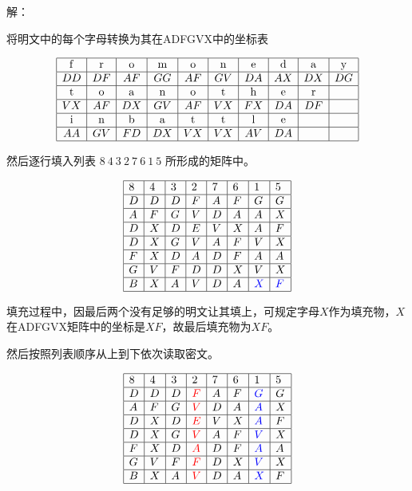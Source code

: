 \documentclass{article}
\begin{document}
解：

将明文中的每个字母转换为其在ADFGVX中的坐标表

$$
\begin{array}{|c|c|c|c|c|c|c|c|c|c|}
\hline \mathrm{f} & \mathrm{r} & \mathrm{o} & \mathrm{m} & \mathrm{o} & \mathrm{n} & \mathrm{e} & \mathrm{d} & \mathrm{a} & \mathrm{y} \\
\hline DD& DF& AF& GG& AF& GV& DA& AX& DX&DG \\
\hline \mathrm{t} & \mathrm{o} & \mathrm{a} & \mathrm{n} & \mathrm{o} & \mathrm{t} & \mathrm{h} & \mathrm{e} & \mathrm{r} & \\
\hline VX& AF& DX& GV& AF& VX& FX& DA& DF& \\
\hline \mathrm{i} & \mathrm{n} & \mathrm{b} & \mathrm{a} & \mathrm{t} & \mathrm{t} & \mathrm{l} & \mathrm{e} & & \\
\hline AA& GV& FD& DX& VX& VX& AV& DA& & \\
\hline
\end{array}\\
$$

然后逐行填入列表\textbf{ $8\ 4\ 3\ 2\ 7\ 6\ 1\ 5$ }所形成的矩阵中。

$$
\begin{array}{|l|l|l|l|l|l|l|l|}
\hline 8 & 4 & 3 & 2 & 7 & 6 & 1 & 5 \\
\hline D&D &D &F &A &F &G &G \\
\hline A& F&G & V& D& A&A & X\\
\hline D& X&D & E& V& X&A & F\\
\hline D& X&G & V& A& F&V & X\\
\hline F& X&D & A& D& F&A & A\\
\hline G& V&F & D& D& X&V &X \\
\hline B& X& A&V &D &A &{\color{blue}X} &{\color{blue}F} \\
\hline
\end{array}
$$


填充过程中，因最后两个没有足够的明文让其填上，可规定字母$X$作为填充物，$X$在ADFGVX矩阵中的坐标是$XF$，故最后填充物为$XF$。

然后按照列表顺序从上到下依次读取密文。

$$
\begin{array}{|l|l|l|l|l|l|l|l|}
\hline 8 & 4 & 3 & 2 & 7 & 6 & 1 & 5 \\
\hline D&D &D &{\color{red}F} &A &F &{\color{blue}G} &G \\
\hline A& F&G & {\color{red}V}& D& A&{\color{blue}A} & X\\
\hline D& X&D & {\color{red}E}& V& X&{\color{blue}A} & F\\
\hline D& X&G & {\color{red}V}& A& F&{\color{blue}V} & X\\
\hline F& X&D & {\color{red}A}& D& F&{\color{blue}A} & A\\
\hline G& V&F & {\color{red}F}& D& X&{\color{blue}V} &X \\
\hline B& X& A&{\color{red}V} &D &A &{\color{blue}X} &F \\
\hline
\end{array}
$$
\end{document}
